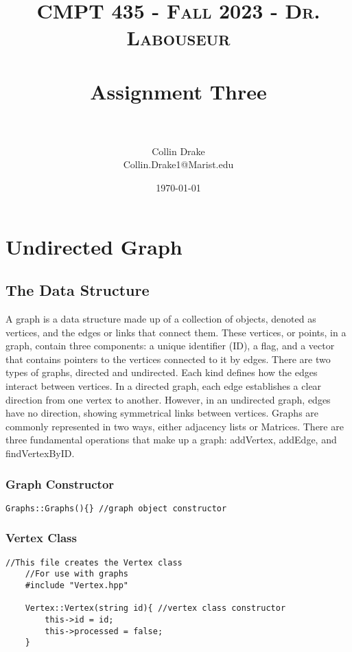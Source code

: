 \documentclass[letterpaper, 10pt,DIV=13]{scrartcl}
\title{	
   \normalfont \normalsize 
   \textsc{CMPT 435 - Fall 2023 - Dr. Labouseur} \\[10pt] %
   \horrule{0.5pt} \\[0.25cm] 	%
   \huge Assignment Three  \\     	    %
   \horrule{0.5pt} \\[0.25cm] 	%
}
\author{Collin Drake \\ \normalsize Collin.Drake1@Marist.edu}
\date{\normalsize\today} 	%
\numberwithin{equation}{section} %
\numberwithin{figure}{section} %
\numberwithin{table}{section} %
\begin{document}
\maketitle %

\section{Undirected Graph}

\subsection{The Data Structure}
A graph is a data structure made up of a collection of objects, denoted as vertices, and the edges or links that connect them. These vertices, or points, in a graph, contain three components: a unique identifier (ID), a flag, and a vector that contains pointers to the vertices connected to it by edges. There are two types of graphs, directed and undirected. Each kind defines how the edges interact between vertices. In a directed graph, each edge establishes a clear direction from one vertex to another. However, in an undirected graph, edges have no direction, showing symmetrical links between vertices. Graphs are commonly represented in two ways, either adjacency lists or Matrices. There are three fundamental operations that make up a graph: addVertex, addEdge, and findVertexByID.

\subsubsection*{Graph Constructor}
    \lstset{numbers=left, numberstyle=\tiny, stepnumber=1, numbersep=5pt, basicstyle=\footnotesize\ttfamily}
    \begin{lstlisting}[frame=single, ]
    Graphs::Graphs(){} //graph object constructor
\end{lstlisting}

\subsubsection*{Vertex Class}
    \lstset{numbers=left, numberstyle=\tiny, stepnumber=1, numbersep=5pt, basicstyle=\footnotesize\ttfamily}
    \begin{lstlisting}[frame=single, ]
    //This file creates the Vertex class
    //For use with graphs
    #include "Vertex.hpp"
    
    Vertex::Vertex(string id){ //vertex class constructor
        this->id = id;
        this->processed = false;
    }
\end{lstlisting}
\end{document}
